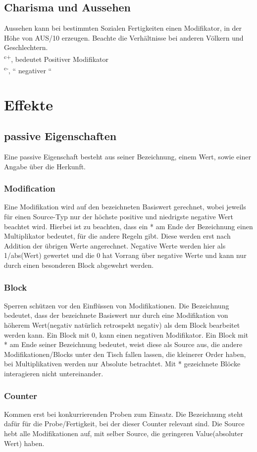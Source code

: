 \documentclass[a4paper,12pt,oneside]{book}
\begin{document}
\section{Charisma und Aussehen}
Aussehen kann bei bestimmten Sozialen Fertigkeiten einen Modifikator, in der Höhe von AUS/10 erzeugen. Beachte die Verhältnisse bei anderen Völkern und Geschlechtern.
\\\textsuperscript{c+}, bedeutet Positiver Modifikator
\\\textsuperscript{c-}, `` negativer ``

\chapter{Effekte}
\section{passive Eigenschaften}
Eine passive Eigenschaft besteht aus seiner Bezeichnung, einem Wert, sowie einer Angabe über die Herkunft.
\subsection{Modification}
Eine Modifikation wird auf den bezeichneten Basiswert gerechnet, wobei jeweils für einen Source-Typ nur der höchste positive und niedrigste negative Wert beachtet wird. Hierbei ist zu beachten, dass ein * am Ende der Bezeichnung einen Multiplikator bedeutet, für die andere Regeln gibt. Diese werden erst nach Addition der übrigen Werte angerechnet. Negative Werte werden hier als 1/abs(Wert) gewertet und die 0 hat Vorrang über negative Werte und kann nur durch einen besonderen Block abgewehrt werden.
\subsection{Block}
Sperren schützen vor den Einflüssen von Modifikationen. Die Bezeichnung bedeutet, dass der bezeichnete Basiswert nur durch eine Modifikation von höherem Wert(negativ natürlich retrospekt negativ) als dem Block bearbeitet werden kann. Ein Block mit 0, kann einen negativen Modifikator. Ein Block mit * am Ende seiner Bezeichnung bedeutet, weist diese als Source aus, die andere Modifikationen/Blocks unter den Tisch fallen lassen, die kleinerer Order haben, bei Multiplikativen werden nur Absolute betrachtet. Mit * gezeichnete Blöcke interagieren nicht untereinander.
\subsection{Counter}
Kommen erst bei konkurrierenden Proben zum Einsatz. Die Bezeichnung steht dafür für die Probe/Fertigkeit, bei der dieser Counter relevant sind. Die Source hebt alle Modifikationen auf, mit selber Source, die geringeren Value(absoluter Wert) haben.
\end{document}

